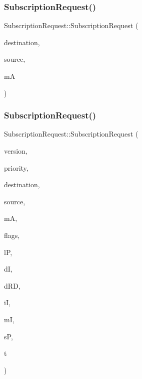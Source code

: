 \subsubsection{\texorpdfstring{Subscription\+Request()}{SubscriptionRequest()}\hspace{0.1cm}{\footnotesize\ttfamily [1/2]}}
{\footnotesize\ttfamily Subscription\+Request\+::\+Subscription\+Request (\begin{DoxyParamCaption}\item[{\hyperlink{structLogicalAddress}{Logical\+Address}}]{destination,  }\item[{\hyperlink{structLogicalAddress}{Logical\+Address}}]{source,  }\item[{\hyperlink{structLogicalAddress}{Logical\+Address}}]{mA }\end{DoxyParamCaption})\hspace{0.3cm}{\ttfamily [inline]}}

\mbox{\label{structSubscriptionRequest_a1fb7f2d417847d7df52ce23d00f632a6}} 
\subsubsection{\texorpdfstring{Subscription\+Request()}{SubscriptionRequest()}\hspace{0.1cm}{\footnotesize\ttfamily [2/2]}}
{\footnotesize\ttfamily Subscription\+Request\+::\+Subscription\+Request (\begin{DoxyParamCaption}\item[{uint8\+\_\+t}]{version,  }\item[{uint8\+\_\+t}]{priority,  }\item[{\hyperlink{structLogicalAddress}{Logical\+Address}}]{destination,  }\item[{\hyperlink{structLogicalAddress}{Logical\+Address}}]{source,  }\item[{\hyperlink{structLogicalAddress}{Logical\+Address}}]{mA,  }\item[{uint16\+\_\+t}]{flags,  }\item[{uint32\+\_\+t}]{lP,  }\item[{uint16\+\_\+t}]{dI,  }\item[{uint16\+\_\+t}]{d\+RD,  }\item[{uint8\+\_\+t}]{iI,  }\item[{uint8\+\_\+t}]{mI,  }\item[{uint8\+\_\+t}]{sP,  }\item[{uint8\+\_\+t}]{t }\end{DoxyParamCaption})\hspace{0.3cm}{\ttfamily [inline]}}



